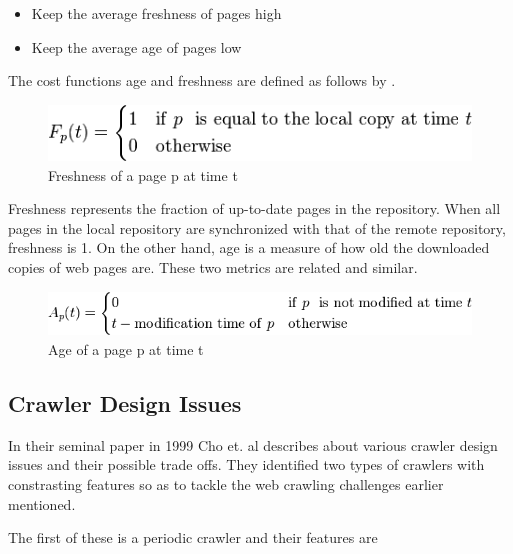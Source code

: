 \documentclass[a4paper, 11pt]{article} %
\begin{document}
\begin{itemize}
\item Keep the average freshness of pages high
\item Keep the average age of pages low
\end{itemize}

The cost functions age and freshness are defined as follows by \cite{cho2000synchronizing}.

\begin{figure}[h] %
\begin{center}
\includegraphics[width=1\textwidth]{freshness.png}
\end{center}
\caption{Freshness of a page p at time t}
\end{figure}

Freshness represents the fraction of up-to-date pages in the repository. When all pages in the local repository are synchronized with that of the remote repository, freshness is 1. On the other hand, age is a measure of how old the downloaded copies of web pages are. These two metrics are related and similar.

\begin{figure}[h] %
\begin{center}
\includegraphics[width=1\textwidth]{age.png}
\end{center}
\caption{Age of a page p at time t}
\end{figure}

\subsection{Crawler Design Issues}

In their seminal paper in 1999 Cho et. al \cite{cho1999evolution} describes about various crawler design issues and their possible trade offs. They identified two types of crawlers with constrasting features so as to tackle the web crawling challenges earlier mentioned.

The first of these is a periodic crawler and their features are
\end{document}
